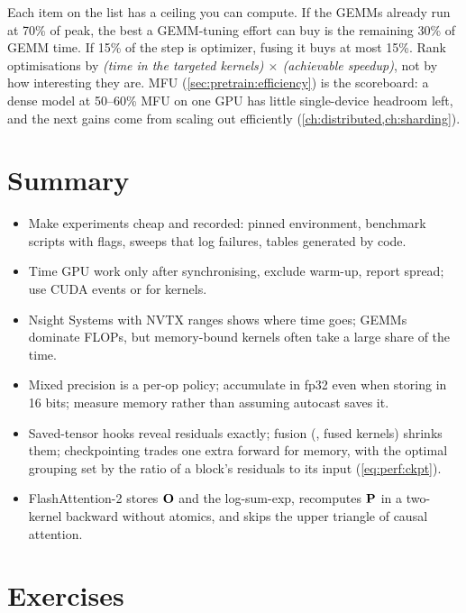 \begin{systemslens}
Each item on the list has a ceiling you can compute. If the GEMMs already run at 70\% of peak, the
best a GEMM-tuning effort can buy is the remaining 30\% of GEMM time. If 15\% of the step is
optimizer, fusing it buys at most 15\%. Rank optimisations by \emph{(time in the targeted kernels)
$\times$ (achievable speedup)}, not by how interesting they are. MFU (\cref{sec:pretrain:efficiency})
is the scoreboard: a dense model at 50--60\% MFU on one GPU has little single-device headroom left,
and the next gains come from scaling out efficiently (\cref{ch:distributed,ch:sharding}).
\end{systemslens}

\section{Summary}\label{sec:perf:summary}
\begin{itemize}
\item Make experiments cheap and recorded: pinned environment, benchmark scripts with flags, sweeps
  that log failures, tables generated by code.
\item Time GPU work only after synchronising, exclude warm-up, report spread; use CUDA events or
   for kernels.
\item Nsight Systems with NVTX ranges shows where time goes; GEMMs dominate FLOPs, but memory-bound
  kernels often take a large share of the time.
\item Mixed precision is a per-op policy; accumulate in fp32 even when storing in 16 bits; measure
  memory rather than assuming autocast saves it.
\item Saved-tensor hooks reveal residuals exactly; fusion (, fused kernels)
  shrinks them; checkpointing trades one extra forward for memory, with the optimal grouping set by
  the ratio of a block's residuals to its input (\cref{eq:perf:ckpt}).
\item FlashAttention-2 stores $\mathbf{O}$ and the log-sum-exp, recomputes $\mathbf{P}$ in a two-kernel
  backward without atomics, and skips the upper triangle of causal attention.
\end{itemize}

\section{Exercises}\label{sec:perf:exercises}

